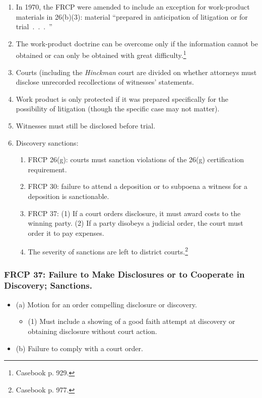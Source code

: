 \begin{enumerate}
    \item In 1970, the FRCP were amended to include an exception for 
    work-product materials in 26(b)(3): material ``prepared in anticipation of 
    litigation or for trial~.~.~.~''
    \item The work-product doctrine can be overcome only if the information 
    cannot be obtained or can only be obtained with great 
    difficulty.\footnote{Casebook p. 929.}
    \item Courts (including the \emph{Hinckman} court are divided on whether 
    attorneys must disclose unrecorded recollections of witnesses' statements.
    \item Work product is only protected if it was prepared specifically for 
    the possibility of litigation (though the specific case may not matter).
    \item Witnesses must still be disclosed before trial.
    \item Discovery sanctions:
    \begin{enumerate}
        \item FRCP 26(g): courts must sanction violations of the 26(g) 
        certification requirement.
        \item FRCP 30: failure to attend a deposition or to subpoena a witness 
        for a deposition is sanctionable.
        \item FRCP 37: (1) If a court orders disclosure, it must award costs 
        to the winning party. (2) If a party disobeys a judicial order, the 
        court must order it to pay expenses.
        \item The severity of sanctions are left to district 
        courts.\footnote{Casebook p. 977.}
    \end{enumerate}
\end{enumerate}

\subsubsection{FRCP 37: Failure to Make Disclosures or to Cooperate in 
Discovery; Sanctions.}

\begin{itemize}
    \item (a) Motion for an order compelling disclosure or discovery.
    \begin{itemize}
        \item (1) Must include a showing of a good faith attempt at discovery 
        or obtaining disclosure without court action.
    \end{itemize}
    \item (b) Failure to comply with a court order.
\end{itemize}
